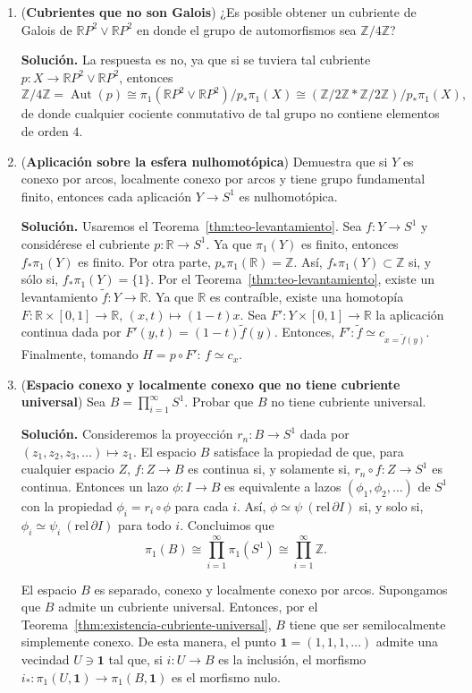 \documentclass[11pt,a4paper]{article}
\theoremstyle{plain}
\theoremstyle{definition}
\theoremstyle{remark}
\newcommand{\RR}{\mathbb R}
\newcommand{\ZZ}{\mathbb Z}
\DeclareMathOperator{\Aut}{Aut}
\begin{document}
\begin{enumerate}[label=\arabic*.,leftmargin=*]
\item (\textbf{Cubrientes que no son Galois}) ¿Es posible obtener un
cubriente de Galois de $\RR P^2\vee\RR P^2$ en donde el grupo de
automorfismos sea $\ZZ/4\ZZ$?

\noindent\textbf{Solución.} La respuesta es no, ya que si se tuviera tal
cubriente $p:X\to\RR P^2\vee\RR P^2$, entonces
\[
\ZZ/4\ZZ=\Aut(p)\cong\pi_1(\RR P^2\vee\RR P^2)/p_*\pi_1(X)\cong(\ZZ/2\ZZ*\ZZ/2\ZZ)/p_*\pi_1(X),
\]
de donde cualquier cociente conmutativo de tal grupo no contiene elementos
de orden $4$.

\item (\textbf{Aplicación sobre la esfera nulhomotópica}) Demuestra que si
$Y$ es conexo por arcos, localmente conexo por arcos y tiene grupo
fundamental finito, entonces cada aplicación $Y\to S^1$ es nulhomotópica.

\noindent\textbf{Solución.} Usaremos el
Teorema~\ref{thm:teo-levantamiento}. Sea $f:Y\to S^1$ y considérese el
cubriente $p:\RR\to S^1$. Ya que $\pi_1(Y)$ es finito, entonces
$f_*\pi_1(Y)$ es finito. Por otra parte, $p_*\pi_1(\RR)=\ZZ$. Así,
$f_*\pi_1(Y)\subset\ZZ$ si, y sólo si, $f_*\pi_1(Y)=\{1\}$. Por el
Teorema~\ref{thm:teo-levantamiento}, existe un levantamiento
$\tilde f:Y\to\RR$. Ya que $\RR$ es contraíble, existe una homotopía
$F:\RR\times[0,1]\to\RR$, $(x,t)\mapsto(1-t)x$. Sea
$F':Y\times[0,1]\to\RR$ la aplicación continua dada por
$F'(y,t)=(1-t)\tilde f(y)$. Entonces, $F':\tilde f\simeq c_{x=\tilde f(y)}$.
Finalmente, tomando $H=p\circ F'$: $f\simeq c_x$.

\item (\textbf{Espacio conexo y localmente conexo que no tiene cubriente
universal}) Sea $B=\prod_{i=1}^\infty S^1$. Probar que $B$ no tiene
cubriente universal.

\noindent\textbf{Solución.} Consideremos la proyección $r_n:B\to S^1$ dada
por $(z_1,z_2,z_3,\dots)\mapsto z_1$. El espacio $B$ satisface la propiedad
de que, para cualquier espacio $Z$, $f:Z\to B$ es continua si, y solamente
si, $r_n\circ f:Z\to S^1$ es continua. Entonces un lazo $\phi:I\to B$ es
equivalente a lazos $(\phi_1,\phi_2,\dots)$ de $S^1$ con la propiedad
$\phi_i=r_i\circ\phi$ para cada $i$. Así, $\phi\simeq\psi\ (\mathrm{rel}\,\partial I)$
si, y solo si, $\phi_i\simeq\psi_i\ (\mathrm{rel}\,\partial I)$ para todo
$i$. Concluimos que
\[
\pi_1(B)\cong\prod_{i=1}^\infty\pi_1(S^1)\cong\prod_{i=1}^\infty\ZZ.
\]

El espacio $B$ es separado, conexo y localmente conexo por arcos.
Supongamos que $B$ admite un cubriente universal. Entonces, por el
Teorema~\ref{thm:existencia-cubriente-universal}, $B$ tiene que ser
semilocalmente simplemente conexo. De esta manera, el punto
$\mathbf 1=(1,1,1,\dots)$ admite una vecindad $U\ni\mathbf 1$ tal que, si
$i:U\to B$ es la inclusión, el morfismo $i_*:\pi_1(U,\mathbf 1)\to\pi_1(B,\mathbf 1)$
es el morfismo nulo.


\end{enumerate}
\end{document}

